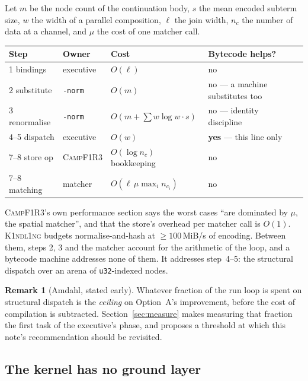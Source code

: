 \documentclass[11pt,a4paper]{article}
\newcommand{\code}[1]{\texttt{#1}}
\newcommand{\Kind}{\textsc{K1ndl1ng}}
\newcommand{\Camp}{\textsc{CampF1R3}}
\theoremstyle{definition}
\newtheorem{remark}[definition]{Remark}
\theoremstyle{plain}
\begin{document}
Let $m$ be the node count of the continuation body, $s$ the mean encoded subterm
size, $w$ the width of a parallel composition, $\ell$ the join width, $n_c$ the
number of data at a channel, and $\mu$ the cost of one matcher call.

\begin{center}
\begin{tabularx}{\linewidth}{@{}llll>{\raggedright\arraybackslash}X@{}}
\toprule
Step & Owner & Cost & Bytecode helps?\\
\midrule
1 bindings & executive & $O(\ell)$ & no\\
2 substitute & \code{-norm} & $O(m)$ & no --- a machine substitutes too\\
3 renormalise & \code{-norm} & $O(m+\sum w\log w\cdot s)$ & no --- identity discipline\\
4--5 dispatch & executive & $O(w)$ & \textbf{yes} --- this line only\\
7--8 store op & \Camp & $O(\log n_c)$ bookkeeping & no\\
7--8 matching & matcher & $O(\ell\,\mu\max_i n_{c_i})$ & no\\
\bottomrule
\end{tabularx}
\end{center}

\noindent
\Camp's own performance section says the worst cases ``are dominated by $\mu$,
the spatial matcher'', and that the store's overhead per matcher call is $O(1)$.
\Kind{} budgets normalise-and-hash at $\ge 100$\,MiB/s of encoding. Between
them, steps 2, 3 and the matcher account for the arithmetic of the loop, and a
bytecode machine addresses none of them. It addresses step~4--5: the
structural dispatch over an arena of \code{u32}-indexed nodes.

\begin{remark}[Amdahl, stated early]\label{rem:amdahl}
Whatever fraction of the run loop is spent on structural dispatch is the
\emph{ceiling} on Option~A's improvement, before the cost of compilation is
subtracted. Section~\ref{sec:measure} makes measuring that fraction the first
task of the executive's phase, and proposes a threshold at which this note's
recommendation should be revisited.
\end{remark}

\subsection{The kernel has no ground layer}\label{sec:noground}
\end{document}
